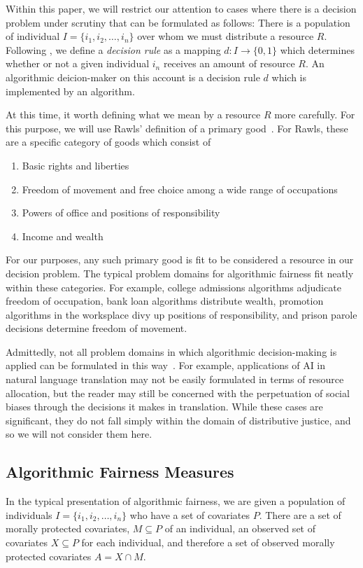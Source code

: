 Within this paper, we will restrict our attention to cases where there is a
decision problem under scrutiny that can be formulated as follows: There is a
population of individual $I = \{i_1, i_2, \dots, i_n\}$ over whom we must
distribute a resource $R$. Following \cite{Kuppler_2021}, we define a
\emph{decision rule} as a mapping $d: I \to \{0, 1\}$ which determines whether
or not a given individual $i_n$ receives an amount of resource $R$. An
algorithmic deicion-maker on this account is a decision rule $d$ which is
implemented by an algorithm.

At this time, it worth defining what we mean by a resource $R$ more carefully.
For this purpose, we will use Rawls' definition of a primary
good~\cite{Rawls_1971}. For Rawls, these are a specific category of goods which
consist of 
\begin{enumerate}
    \item Basic rights and liberties
    \item Freedom of movement and free choice among a wide range of occupations
    \item Powers of office and positions of responsibility
    \item Income and wealth
\end{enumerate}
For our purposes, any such primary good is fit to be considered a resource
in our decision problem. The typical problem domains for algorithmic
fairness fit neatly within these categories. For example, college admissions
algorithms adjudicate freedom of occupation, bank loan algorithms distribute
wealth, promotion algorithms in the worksplace divy up positions of
responsibility, and prison parole decisions determine freedom of movement.

Admittedly, not all problem domains in which algorithmic decision-making is
applied can be formulated in this way~\cite{Green_2017}. For example,
applications of AI in natural language translation may not be easily formulated
in terms of resource allocation, but the reader may still be concerned with the
perpetuation of social biases through the decisions it makes in translation.
While these cases are significant, they do not fall simply within the domain of
distributive justice, and so we will not consider them here.

\subsection{Algorithmic Fairness Measures}\label{sec:fairness-measures}
In the typical presentation of algorithmic fairness, we are given a population
of individuals $I = \{i_1, i_2, \ldots, i_n\}$ who have a set of covariates
$P$. There are a set of morally protected covariates, $M \subseteq P$ of an
individual, an observed set of covariates $X \subseteq P$ for each individual,
and therefore a set of observed morally protected covariates $A = X \cap M$.

